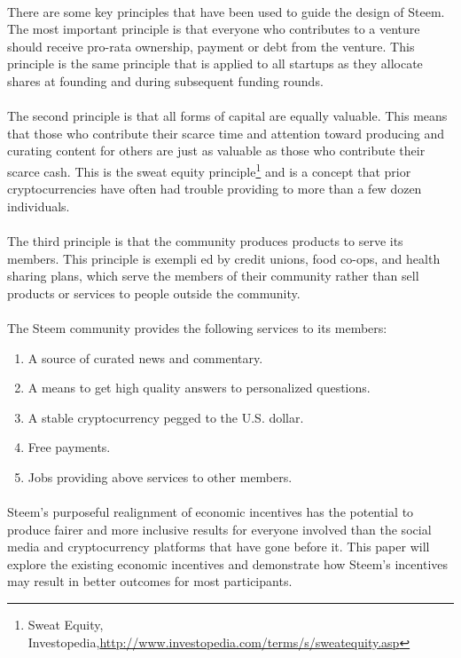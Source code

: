 \documentclass{article}
\begin{document}
		\paragraph{}
			There are some key principles that have been used to guide the design of Steem. The most important principle is that everyone who contributes to a venture should receive pro-rata ownership, payment or debt from the venture. This principle is the same principle that is applied to all startups as they allocate shares at founding and during subsequent funding rounds.

		\paragraph{}
			The second principle is that all forms of capital are equally valuable. This means that those who contribute their scarce time and attention toward producing and curating content for others are just as valuable as those who contribute their scarce cash. This is the sweat equity principle\footnote{Sweat Equity, Investopedia,\newline\url{http://www.investopedia.com/terms/s/sweatequity.asp}} and is a concept that prior cryptocurrencies have often had trouble providing to more than a few dozen individuals.

		\paragraph{}
			The third principle is that the community produces products to serve its members. This principle is exempli ed by credit unions, food co-ops, and health sharing plans, which serve the members of their community rather than sell products or services to people outside the community.

		\paragraph{}
			The Steem community provides the following services to its members:

		\begin{enumerate}
			\item A source of curated news and commentary.
			\item A means to get high quality answers to personalized questions.
			\item A stable cryptocurrency pegged to the U.S. dollar.
			\item Free payments.
			\item Jobs providing above services to other members.
		\end{enumerate}

		\paragraph{}
			Steem's purposeful realignment of economic incentives has the potential to produce fairer and more inclusive results for everyone involved than the social media and cryptocurrency platforms that have gone before it. This paper will explore the existing economic incentives and demonstrate how Steem's incentives may result in better outcomes for most participants.
\end{document}
